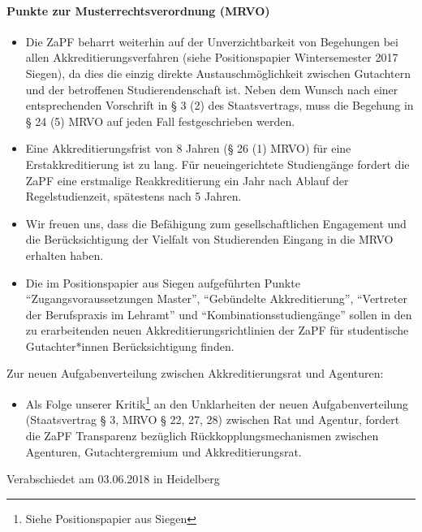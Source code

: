 \documentclass[DIV=calc]{scrartcl}
\begin{document}
\paragraph{Punkte zur Musterrechtsverordnung (MRVO)}
\begin{itemize}
\item Die ZaPF beharrt weiterhin auf der Unverzichtbarkeit von Begehungen bei allen Akkreditierungsverfahren (siehe Positionspapier Wintersemester 2017 Siegen), da dies die einzig direkte Austauschmöglichkeit zwischen Gutachtern und der betroffenen Studierendenschaft ist. 
    Neben dem Wunsch nach einer entsprechenden Vorschrift in § 3 (2) des Staatsvertrags, muss die Begehung in § 24 (5) MRVO auf jeden Fall festgeschrieben werden.

\item Eine Akkreditierungsfrist von 8 Jahren (§ 26 (1) MRVO) für eine Erstakkreditierung ist zu lang. Für neueingerichtete Studiengänge fordert die ZaPF eine erstmalige Reakkreditierung ein Jahr nach Ablauf der Regelstudienzeit, spätestens nach 5 Jahren.

\item Wir freuen uns, dass die Befähigung zum gesellschaftlichen Engagement und die Berücksichtigung der Vielfalt von Studierenden Eingang in die MRVO erhalten haben.

\item Die im Positionspapier aus Siegen aufgeführten Punkte "`Zugangsvoraussetzungen Master"', "`Gebündelte Akkreditierung"', "`Vertreter der Berufspraxis im Lehramt"' und "`Kombinationsstudiengänge"' sollen in den zu erarbeitenden neuen Akkreditierungsrichtlinien der ZaPF für studentische Gutachter*innen Berücksichtigung finden. 
\end{itemize}
Zur neuen Aufgabenverteilung zwischen Akkreditierungsrat und Agenturen:
\begin{itemize}
\item Als Folge unserer Kritik\footnote{Siehe Positionspapier aus Siegen} an den Unklarheiten der neuen Aufgabenverteilung (Staatsvertrag § 3, MRVO § 22, 27, 28) zwischen Rat und Agentur, fordert die ZaPF Transparenz bezüglich Rückkopplungsmechanismen zwischen Agenturen, Gutachtergremium und Akkreditierungsrat.
\end{itemize}
\vfill
    \begin{flushright}
        Verabschiedet am 03.06.2018 in Heidelberg
    \end{flushright}
\end{document}
